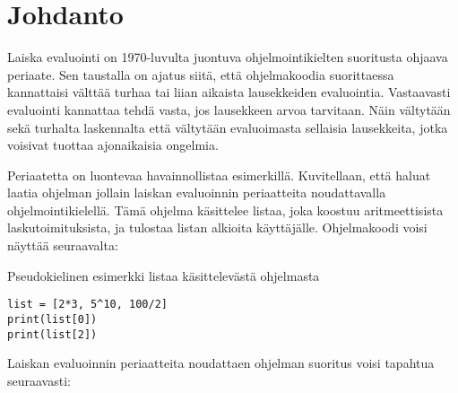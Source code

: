 
\section{Johdanto}

Laiska evaluointi on 1970-luvulta juontuva ohjelmointikielten suoritusta ohjaava periaate. Sen taustalla on ajatus siitä, että ohjelmakoodia suorittaessa kannattaisi välttää turhaa tai liian aikaista lausekkeiden evaluointia. Vastaavasti evaluointi kannattaa tehdä vasta, jos lausekkeen arvoa tarvitaan. Näin vältytään sekä turhalta laskennalta että vältytään evaluoimasta sellaisia lausekkeita, jotka voisivat tuottaa ajonaikaisia ongelmia.

Periaatetta on luontevaa havainnollistaa esimerkillä. Kuvitellaan, että haluat laatia ohjelman jollain laiskan evaluoinnin periaatteita noudattavalla ohjelmointikielellä. Tämä ohjelma käsittelee listaa, joka koostuu aritmeettisista laskutoimituksista, ja tulostaa listan alkioita käyttäjälle. Ohjelmakoodi voisi näyttää seuraavalta:


\begin{listing}[H]
  \caption{Pseudokielinen esimerkki listaa käsittelevästä ohjelmasta}
  \bigskip
  \begin{verbatim}
list = [2*3, 5^10, 100/2]
print(list[0])
print(list[2])
  \end{verbatim}
\end{listing}

Laiskan evaluoinnin periaatteita noudattaen ohjelman suoritus voisi tapahtua seuraavasti:

